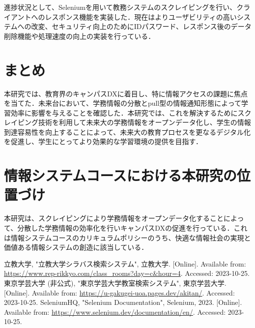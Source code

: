 \documentclass[11pt]{ujarticle}
\begin{document}
進捗状況として、Seleniumを用いて教務システムのスクレイピングを行い、クライアントへのレスポンス機能を実装した．現在はよりユーザビリティの高いシステムへの改変、セキュリティ向上のためにIDパスワード、レスポンス後のデータ削除機能や処理速度の向上の実装を行っている．

\section{まとめ}

本研究では、教育界のキャンパスDXに着目し、特に情報アクセスの課題に焦点を当てた．未来台において、学務情報の分散とpull型の情報通知形態によって学習効率に影響を与えることを確認した．本研究では、これを解決するためにスクレイピング技術を利用して未来大の学務情報をオープンデータ化し、学生の情報到達容易性を向上することによって、未来大の教育プロセスを更なるデジタル化を促進し、学生にとってより効果的な学習環境の提供を目指す．

\section{情報システムコースにおける本研究の位置づけ}

本研究は、スクレイピングにより学務情報をオープンデータ化することによって、分散した学務情報の効率化を行いキャンパスDXの促進を行っている．これは情報システムコースのカリキュラムポリシーのうち、快適な情報社会の実現と価値ある情報システムの創造に該当している．

\begin{thebibliography}{99}
	立教大学, "立教大学シラバス検索システム", 立教大学. [Online]. Available from: \url{https://www.rep-rikkyo.com/class_rooms?day=c&hour=4}. Accessed: 2023-10-25.
	東京学芸大学 (非公式), "東京学芸大学教室検索システム", 東京学芸大学. [Online]. Available from: \url{https://u-gakugei-uoa.pages.dev/akitan/}. Accessed: 2023-10-25.
	SeleniumHQ, "Selenium Documentation", Selenium, 2023. [Online]. Available from: \url{https://www.selenium.dev/documentation/en/}. Accessed: 2023-10-25.
\end{thebibliography}
\end{document}
